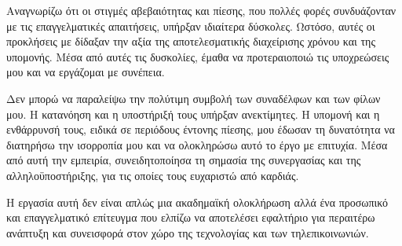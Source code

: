 Αναγνωρίζω ότι οι στιγμές αβεβαιότητας και πίεσης, που πολλές φορές συνδυάζονταν με τις επαγγελματικές απαιτήσεις, υπήρξαν ιδιαίτερα δύσκολες. Ωστόσο, αυτές οι προκλήσεις με δίδαξαν την αξία της αποτελεσματικής διαχείρισης χρόνου και της υπομονής. Μέσα από αυτές τις δυσκολίες, έμαθα να προτεραιοποιώ τις υποχρεώσεις μου και να εργάζομαι με συνέπεια.

Δεν μπορώ να παραλείψω την πολύτιμη συμβολή των συναδέλφων και των φίλων μου. Η κατανόηση και η υποστήριξή τους υπήρξαν ανεκτίμητες. Η υπομονή και η ενθάρρυνσή τους, ειδικά σε περιόδους έντονης πίεσης, μου έδωσαν τη δυνατότητα να διατηρήσω την ισορροπία μου και να ολοκληρώσω αυτό το έργο με επιτυχία. Μέσα από αυτή την εμπειρία, συνειδητοποίησα τη σημασία της συνεργασίας και της αλληλοϋποστήριξης, για τις οποίες τους ευχαριστώ από καρδιάς.

Η εργασία αυτή δεν είναι απλώς μια ακαδημαϊκή ολοκλήρωση αλλά ένα προσωπικό και επαγγελματικό επίτευγμα που ελπίζω να αποτελέσει εφαλτήριο για περαιτέρω ανάπτυξη και συνεισφορά στον χώρο της τεχνολογίας και των τηλεπικοινωνιών.

